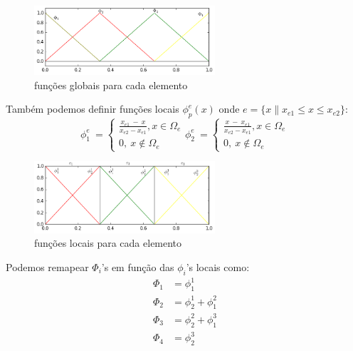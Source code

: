 \begin{figure}[!h]
\includegraphics[width=0.6\textwidth, center ]{figuras/Matrix_elem_global.png}
\caption{funções globais para cada elemento}
\end{figure}

Também podemos definir funções locais $\phi^e_p(x)$ onde $e = \{x \| x_{e1} \leq x \leq x_{e2} \}$:
\begin{equation}
\phi^e_1\ = \left\{\begin{matrix}
\frac{x_{e1}\ -\ x}{x_{e2} - x_{e1}}, x \in \Omega_e \\
0 ,\ x \notin \Omega_e 
\end{matrix}\right.
\phi^e_2\ = \left\{\begin{matrix}
\frac{x\ -\ x_{e1}}{x_{e2} - x_{e1}}, x \in \Omega_e \\
0 ,\ x \notin \Omega_e 
\end{matrix}\right.
\end{equation} 

\begin{figure}[!h]
\includegraphics[width=0.6\textwidth, center ]{figuras/Matrix_element_local.png}
\caption{funções locais para cada elemento}
\end{figure}
 Podemos remapear $\Phi_i$'s em função das $\phi_i$'s locais como:
\begin{align}
\Phi_1 &= \phi_{1}^{1} \\[0.5pt]
\Phi_2 &= \phi_{2}^{1} + \phi_{1}^{2} \\[0.5pt]
\Phi_3 &= \phi_{2}^{2} + \phi_{1}^{3} \\[0.5pt]
\Phi_4 &= \phi_{2}^{3}
\end{align}

